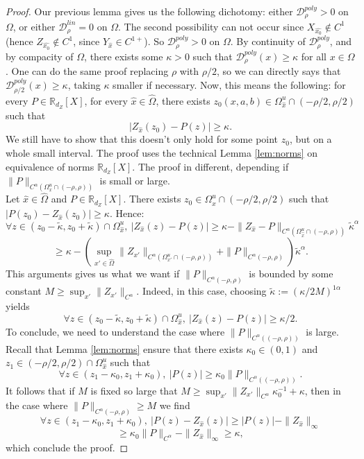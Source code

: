 \documentclass[a4paper]{article}
\theoremstyle{definition}
\begin{document}
\begin{proof}
Our previous lemma gives us the following dichotomy: either $\mathcal{D}_\rho^{poly} > 0$ on $\Omega$, or either $\mathcal{D}_\rho^{lin} =0$ on $\Omega$. The second possibility can not occur since $X_{\widehat{x_0}} \notin C^1$ (hence $Z_{\widehat{x_0}} \notin C^1$, since $Y_{\widehat{x}} \in C^{1+}$). So $\mathcal{D}_{\rho}^{poly} > 0$ on $\Omega$. By continuity of $\mathcal{D}_\rho^{poly}$, and by compacity of $\Omega$, there exists some $\kappa>0$ such that $\mathcal{D}_\rho^{poly}(x) \geq \kappa$ for all $x \in \Omega$. One can do the same proof replacing $\rho$ with $\rho/2$, so we can directly says that $\mathcal{D}_{\rho/2}^{poly}(x) \geq \kappa$, taking $\kappa$ smaller if necessary. Now, this means the following: for every $P \in \mathbb{R}_{d_Z}[X]$, for every ${\widehat{x}} \in \widehat{\Omega}$, there exists $z_0(x,a,b) \in \Omega_{\widehat{x}}^u \cap (- \rho/2,\rho/2)$ such that
$$ |Z_{\widehat{x}}(z_0)-P(z)| \geq \kappa. $$
We still have to show that this doesn't only hold for some point $z_0$, but on a whole small interval. The proof uses the technical Lemma \ref{lem:norms} on equivalence of norms $\mathbb{R}_{d_Z}[X]$. The proof in different, depending if $\|P\|_{C^\alpha( \Omega_x^u \cap (-\rho,\rho) )}$ is small or large. \\

Let ${\widehat{x}} \in \widehat{\Omega}$ and $P \in \mathbb{R}_{d_Z}[X]$. There exists $z_0 \in \Omega_{\widehat{x}}^u \cap (-\rho/2,\rho/2)$ such that $|P(z_0)-Z_{\widehat{x}}(z_0)| \geq \kappa$. Hence:
$$ \forall z \in (z_0-\tilde{\kappa},z_0+\tilde{\kappa}) \cap \Omega_{\widehat{x}}^u, \ |Z_{\widehat{x}}(z)-P(z)| \geq \kappa - \|Z_{\widehat{x}} - P\|_{C^\alpha(\Omega_{\widehat{x}}^u \cap (-\rho,\rho))} \tilde{\kappa}^{\alpha} $$
$$ \geq \kappa - ( \sup_{x' \in \widehat{\Omega}} \|Z_{x'}\|_{C^\alpha(\Omega_{x'}^u \cap (-\rho,\rho))} + \|P\|_{C^\alpha(-\rho,\rho)} ) \tilde{\kappa}^\alpha. $$
This arguments gives us what we want if $\|P\|_{C^\alpha(-\rho,\rho)}$ is bounded by some constant $M \geq \sup_{x'} \|Z_{x'}\|_{C^\alpha}$. Indeed, in this case, choosing $\tilde{\kappa} := (\kappa/2M)^{1\alpha}$ yields
$$ \forall z \in (z_0-\tilde{\kappa},z_0+\tilde{\kappa}) \cap \Omega_{\widehat{x}}^u, \ |Z_{\widehat{x}}(z)-P(z)| \geq \kappa/2.$$
To conclude, we need to understand the case where $\|P\|_{C^\alpha((-\rho,\rho))}$ is large.
Recall that Lemma \ref{lem:norms} ensure that there exists $\kappa_{0} \in (0,1)$ and $z_1 \in (-\rho/2,\rho/2) \cap \Omega_{\widehat{x}}^u$ such that $$ \forall z \in (z_1 - \kappa_0, z_1 + \kappa_0), \ |P(z)| \geq \kappa_0 \|P\|_{C^\alpha((-\rho,\rho))} .$$
It follows that if $M$ is fixed so large that $M \geq \sup_{x'}\| Z_{x'} \|_{C^\alpha} \kappa_0^{-1} + \kappa$, then in the case where $\|P\|_{C^\alpha(-\rho,\rho)} \geq M$ we find
$$ \forall z \in (z_1 - \kappa_0, z_1 + \kappa_0), \ |P(z) - Z_{\widehat{x}}(z)| \geq |P(z)| - \|Z_{\widehat{x}}\|_{\infty} $$
$$ \geq \kappa_0 \|P\|_{C^{\alpha}} - \|Z_{\widehat{x}}\|_{\infty} \geq \kappa ,$$
which conclude the proof. \end{proof}
\end{document}
